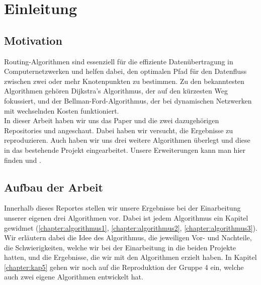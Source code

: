 \chapter{Einleitung}
\label{chapter:kap1}

\section{Motivation}
    Routing-Algorithmen sind essenziell für die effiziente Datenübertragung in Computernetzwerken und helfen dabei, den optimalen Pfad für den Datenfluss zwischen zwei oder mehr Knotenpunkten zu bestimmen. Zu den bekanntesten Algorithmen gehören Dijkstra's Algorithmus, der auf den kürzesten Weg fokussiert, und der Bellman-Ford-Algorithmus, der bei dynamischen Netzwerken mit wechselnden Kosten funktioniert. \\
    In dieser Arbeit haben wir uns das Paper \cite{parham2021traffic} und die zwei dazugehörigen Repositories \cite{original_p1} und \cite{original_p2} angeschaut. Dabei haben wir versucht, die Ergebnisse zu reproduzieren. Auch haben wir uns drei weitere Algorithmen überlegt und diese in das bestehende Projekt eingearbeitet. Unsere Erweiterungen kann man hier finden \cite{reproduktion_p1} und \cite{reproduktion_p2}.


\section{Aufbau der Arbeit}
    Innerhalb dieses Reportes stellen wir unsere Ergebnisse bei der Einarbeitung unserer eigenen drei Algorithmen vor. Dabei ist jedem Algorithmus ein Kapitel gewidmet (\ref{chapter:algorithmus1}, \ref{chapter:algorithmus2}, \ref{chapter:algorithmus3}). Wir erläutern dabei die Idee des Algorithmus, die jeweiligen Vor- und Nachteile, die Schwierigkeiten, welche wir bei der Einarbeitung in die beiden Projekte hatten, und die Ergebnisse, die wir mit den Algorithmen erzielt haben. In Kapitel \ref{chapter:kap5} gehen wir noch auf die Reproduktion der Gruppe 4 ein, welche auch zwei eigene Algorithmen entwickelt hat.  